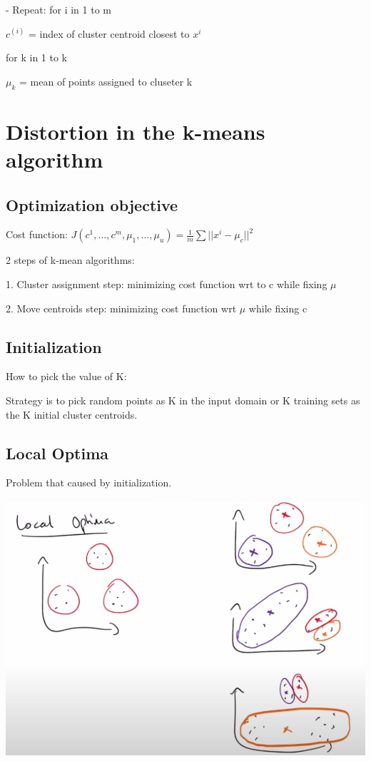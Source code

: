 \documentclass{article}
\begin{document}
- Repeat: 
    for i in 1 to m

    \hspace{1.1cm}$c^{(i)}$ = index of cluster centroid closest to $x^i$

    for k in 1 to k

    \hspace{1.1cm}$\mu_k$ = mean of points assigned to cluseter k


\section*{Distortion in the k-means algorithm}

\subsection*{Optimization objective }
Cost function: $J(c^1, ... , c^m, \mu_1, ..., \mu_u) = \frac{1}{m}\sum ||x^i -\mu_c||^2$

2 steps of k-mean algorithms:

1. Cluster assignment step: minimizing cost function wrt to c while fixing $\mu$

2. Move centroids step: minimizing cost function wrt $\mu$ while fixing c

\subsection*{Initialization}
How to pick the value of K:

                            
Strategy is to pick random points as K in the input domain or K training sets as the K initial cluster centroids. 

\subsection*{Local Optima}
Problem that caused by initialization. 

\includegraphics[width=0.7\linewidth]{W2V3.png}
\end{document}
